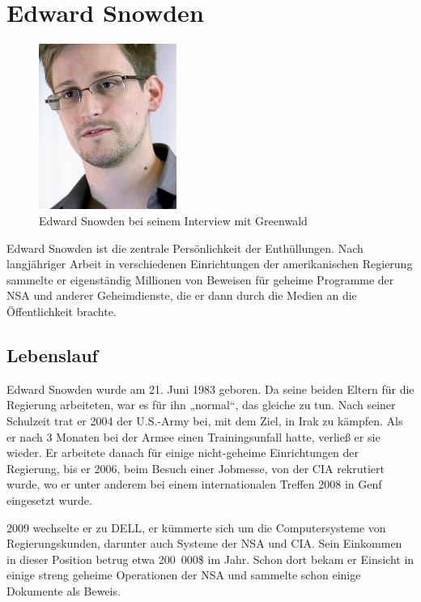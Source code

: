 \documentclass[12pt,a4paper]{scrartcl}
\begin{document}
\section{Edward Snowden}
\begin{figure}
\centering
\includegraphics[width=0.4\textwidth]{images/snowden.jpg}
\caption{Edward Snowden bei seinem Interview mit Greenwald \cite{commons_snowden}}
\end{figure}
Edward Snowden ist die zentrale Persönlichkeit der Enthüllungen. Nach langjähriger Arbeit in verschiedenen Einrichtungen der amerikanischen Regierung sammelte er eigenständig Millionen von Beweisen für geheime Programme der NSA und anderer Geheimdienste, die er dann durch die Medien an die Öffentlichkeit brachte.

\subsection{Lebenslauf}
Edward Snowden wurde am 21. Juni 1983 geboren.
Da seine beiden Eltern für die Regierung arbeiteten, war es für ihn „normal“, das gleiche zu tun.\cite{wiki_snowden}
Nach seiner Schulzeit trat er 2004 der U.S.-Army bei, mit dem Ziel, in Irak zu kämpfen. Als er nach 3 Monaten bei der Armee einen Trainingsunfall hatte, verließ er sie wieder.\cite{wiki_snowden}
Er arbeitete danach für einige nicht-geheime Einrichtungen der Regierung, bis er 2006, beim Besuch einer Jobmesse, von der CIA rekrutiert wurde, wo er unter anderem bei einem internationalen Treffen 2008 in Genf eingesetzt wurde.
\cite{wiki_snowden}

2009 wechselte er zu DELL, er kümmerte sich um die Computersysteme von Regierungskunden, darunter auch Systeme der NSA und CIA. Sein Einkommen in dieser Position betrug etwa 200~000\$ im Jahr.
Schon dort bekam er Einsicht in einige streng geheime Operationen der NSA und sammelte schon einige Dokumente als Beweis.\cite{wiki_snowden}
\end{document}
